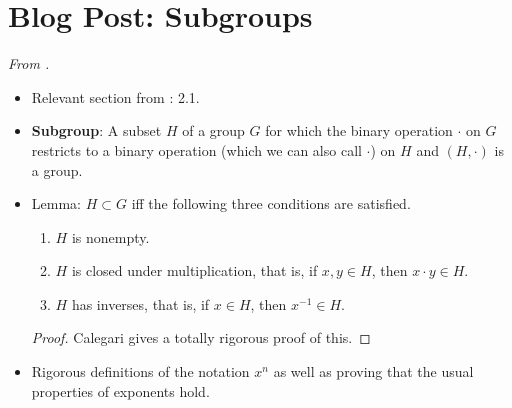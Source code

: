 \documentclass[../notes.tex]{subfiles}
\begin{document}
\section{Blog Post: Subgroups}
\emph{From \textcite{bib:Calegari}.}
\begin{itemize}
    \item {}Relevant section from \textcite{bib:DummitFoote}: 2.1.
    \item \textbf{Subgroup}: A subset $H$ of a group $G$ for which the binary operation $\cdot$ on $G$ restricts to a binary operation (which we can also call $\cdot$) on $H$ and $(H,\cdot)$ is a group.
    \item Lemma: $H\subset G$ iff the following three conditions are satisfied.
    \begin{enumerate}
        \item $H$ is nonempty.
        \item $H$ is closed under multiplication, that is, if $x,y\in H$, then $x\cdot y\in H$.
        \item $H$ has inverses, that is, if $x\in H$, then $x^{-1}\in H$.
    \end{enumerate}
    \begin{proof}
        Calegari gives a totally rigorous proof of this.
    \end{proof}
    \item Rigorous definitions of the notation $x^n$ as well as proving that the usual properties of exponents hold.
\end{itemize}
\end{document}
